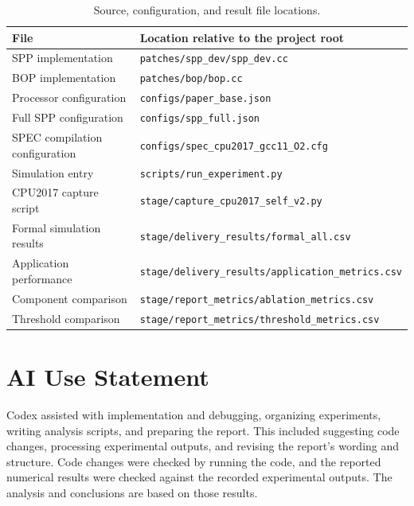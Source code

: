 \documentclass[a4paper,11pt]{article}
\newcommand{\code}[1]{\texttt{#1}}
\begin{document}
\begin{table}[htbp]
\centering\small
\caption{Source, configuration, and result file locations.}\label{tab:files}
\begin{tabularx}{\linewidth}{@{}p{43mm}Y@{}}
\toprule
File & Location relative to the project root\\
\midrule
SPP implementation & \code{patches/spp\_dev/spp\_dev.cc}\\
BOP implementation & \code{patches/bop/bop.cc}\\
Processor configuration & \code{configs/paper\_base.json}\\
Full SPP configuration & \code{configs/spp\_full.json}\\
SPEC compilation configuration & \code{configs/spec\_cpu2017\_gcc11\_O2.cfg}\\
Simulation entry & \code{scripts/run\_experiment.py}\\
CPU2017 capture script & \code{stage/capture\_cpu2017\_self\_v2.py}\\
Formal simulation results & \code{stage/delivery\_results/formal\_all.csv}\\
Application performance & \code{stage/delivery\_results/application\_metrics.csv}\\
Component comparison & \code{stage/report\_metrics/ablation\_metrics.csv}\\
Threshold comparison & \code{stage/report\_metrics/threshold\_metrics.csv}\\
\bottomrule
\end{tabularx}
\end{table}

\section{AI Use Statement}\label{app:tools}
Codex assisted with implementation and debugging, organizing experiments, writing analysis scripts, and preparing the report. This included suggesting code changes, processing experimental outputs, and revising the report's wording and structure. Code changes were checked by running the code, and the reported numerical results were checked against the recorded experimental outputs. The analysis and conclusions are based on those results.
\end{document}
